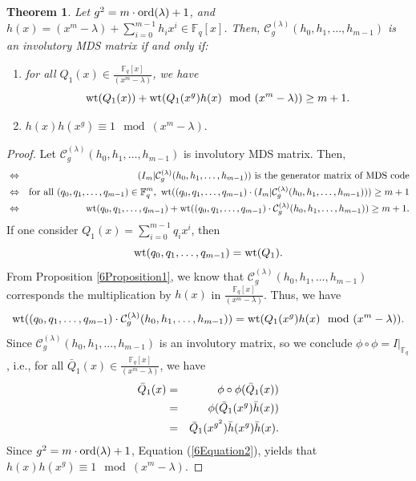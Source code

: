 \documentclass[12pt]{article}
\newtheorem{theorem}{Theorem}
\begin{document}
\begin{theorem}
	Let $g^2=m \cdot \textup{ord}(\lambda)+1$, and $h(x)=(x^m-\lambda)+\sum_{i=0}^{m-1}h_ix^i\in \mathbb{F}_q[x]$. Then, $\mathcal{C}_g^{(\lambda)}(h_0, h_1, \ldots, h_{m-1})$ is an involutory MDS matrix if and only if:
	\begin{enumerate}
		\item [(i)] for all $Q_1(x)\in \frac{\mathbb{F}_q[x]}{(x^m-\lambda)}$, we have 
		$$\textup{wt}(Q_1(x))+\textup{wt}(Q_1(x^g)h(x) \mod (x^m-\lambda))\geq m+1.$$
		\item [(ii)] $h(x)h(x^g)\equiv 1 \mod (x^m-\lambda).$
	\end{enumerate} 
\end{theorem}
\begin{proof}
	Let $\mathcal{C}_g^{(\lambda)}(h_0, h_1, \ldots, h_{m-1})$ is involutory MDS matrix. Then,  
	\begin{eqnarray*}
		&\Leftrightarrow& (I_m|\mathcal{C}_g^{(\lambda)}(h_0, h_1, \ldots, h_{m-1}))~\textup{is the generator matrix of MDS code}\\
		&\Leftrightarrow& \textup{for all } (q_0,q_1,\dots,q_{m-1})\in \mathbb{F}^m_{q},~\textup{wt}((q_0,q_1,\dots,q_{m-1})\cdot(I_m|\mathcal{C}_g^{(\lambda)}(h_0, h_1, \ldots, h_{m-1})))\geq m+1\\
		&\Leftrightarrow& \textup{wt}(q_0,q_1,\dots,q_{m-1})+\textup{wt}((q_0,q_1,\dots,q_{m-1})\cdot \mathcal{C}_g^{(\lambda)}(h_0, h_1, \ldots, h_{m-1}))\geq m+1.
	\end{eqnarray*}
	If one consider $Q_1( x)=\sum_{i=0}^{m-1}q_ix^i$, then 
	$$\textup{wt}(q_0,q_1,\dots,q_{m-1})=\textup{wt}(Q_1).$$
	From Proposition \ref{6Proposition1}, we know that $\mathcal{C}_g^{(\lambda)}(h_0, h_1, \ldots, h_{m-1})$ corresponds the multiplication by \( h (x) \) in \( \frac{\mathbb{F}_{q}[x]}{(x^m - \lambda)} \). Thus, we have
	$$\textup{wt}((q_0,q_1,\dots,q_{m-1})\cdot \mathcal{C}_g^{(\lambda)}(h_0, h_1, \ldots, h_{m-1}))=\textup{wt}(Q_1(x^g)h(x) \mod  (x^m-\lambda)).$$
	Since $\mathcal{C}_g^{(\lambda)}(h_0, h_1, \ldots, h_{m-1})$ is an involutory matrix, so we conclude  $\phi \circ \phi =I|_{\mathbb{F}_q}$, i.e., for all $\bar{Q}_1(x)\in \frac{\mathbb{F}_q[x]}{(x^m-\lambda)}$, we have
	\begin{eqnarray}\label{6Equation2}
		\bar{Q}_1(x)\notag&=&\phi\circ\phi(\bar{Q}_1(x))\\
		\notag&=&\phi(\bar{Q}_1(x^g)\bar{h}(x))\\
		&=&\bar{Q}_1(x^{g^2})\bar{h}(x^g)\bar{h}(x) .
	\end{eqnarray}
Since $g^2=m \cdot \textup{ord}(\lambda)+1$, 	Equation (\ref{6Equation2}), yields that   $h(x)h(x^g)\equiv 1 \mod (x^m-\lambda).$ 
\end{proof}
\end{document}
